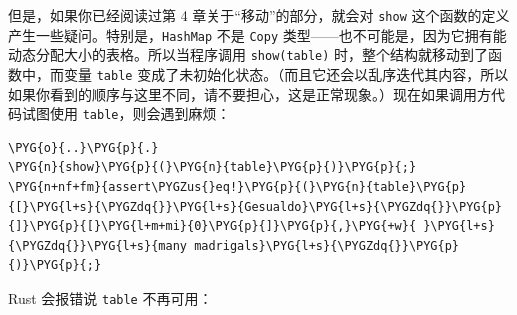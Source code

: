 但是，如果你已经阅读过第 4 章关于“移动”的部分，就会对 \texttt{show} 这个函数的定义产生一些疑问。特别是，\texttt{HashMap} 不是 \texttt{Copy} 类型——也不可能是，因为它拥有能动态分配大小的表格。所以当程序调用 \texttt{show(table)} 时，整个结构就移动到了函数中，而变量 \texttt{table} 变成了未初始化状态。（而且它还会以乱序迭代其内容，所以如果你看到的顺序与这里不同，请不要担心，这是正常现象。）现在如果调用方代码试图使用 \texttt{table}，则会遇到麻烦：

\begin{Verbatim}[commandchars=\\\{\},breaklines=true,breakanywhere=true,fontsize=\codefont,xleftmargin=17bp]
\PYG{o}{..}\PYG{p}{.}
\PYG{n}{show}\PYG{p}{(}\PYG{n}{table}\PYG{p}{)}\PYG{p}{;}
\PYG{n+nf+fm}{assert\PYGZus{}eq!}\PYG{p}{(}\PYG{n}{table}\PYG{p}{[}\PYG{l+s}{\PYGZdq{}}\PYG{l+s}{Gesualdo}\PYG{l+s}{\PYGZdq{}}\PYG{p}{]}\PYG{p}{[}\PYG{l+m+mi}{0}\PYG{p}{]}\PYG{p}{,}\PYG{+w}{ }\PYG{l+s}{\PYGZdq{}}\PYG{l+s}{many madrigals}\PYG{l+s}{\PYGZdq{}}\PYG{p}{)}\PYG{p}{;}
\end{Verbatim}

Rust 会报错说 \texttt{table} 不再可用：

